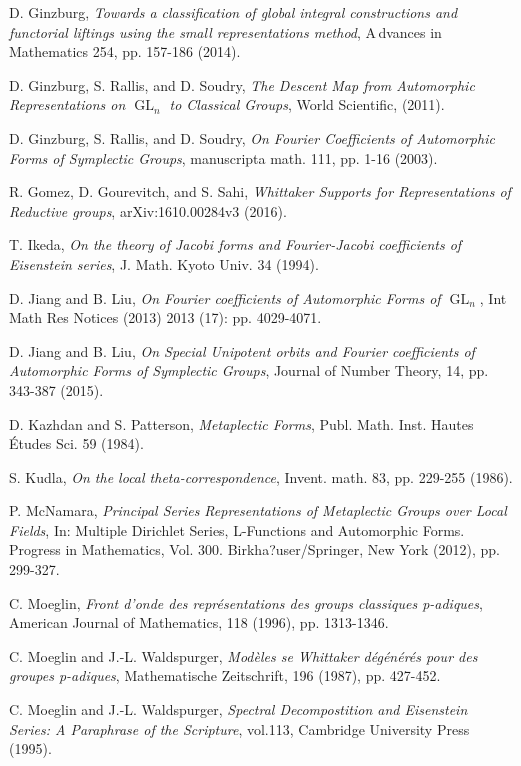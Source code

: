\documentclass[11pt,reqno]{amsart}
\theoremstyle{definition}
\theoremstyle{remark}
\theoremstyle{definition}
\begin{document}
\begin{thebibliography}{99}
D. Ginzburg, \emph{Towards a classification of global integral constructions and functorial liftings using the small representations method}, A\,dvances in Mathematics  254, pp. 157-186 (2014).

 D. Ginzburg, S. Rallis, and D. Soudry, \emph{The Descent Map from Automorphic Representations on $\operatorname{GL}_n$ to Classical Groups}, World Scientific, (2011).

 D. Ginzburg, S. Rallis, and D. Soudry, \emph{On Fourier Coefficients of Automorphic Forms of Symplectic Groups}, manuscripta math. 111, pp. 1-16 (2003).

 R. Gomez, D. Gourevitch, and S. Sahi, \emph{Whittaker Supports for Representations of Reductive groups},  arXiv:1610.00284v3 (2016).

 T. Ikeda, \emph{On the theory of Jacobi forms and Fourier-Jacobi coefficients of Eisenstein series}, J. Math. Kyoto Univ. 34 (1994).

 D. Jiang and B. Liu, \emph{On Fourier coefficients of Automorphic Forms of $\operatorname{GL}_n$}, Int Math Res Notices (2013) 2013 (17): pp. 4029-4071.

 D. Jiang and B. Liu, \emph{On Special Unipotent orbits and Fourier coefficients of Automorphic Forms of Symplectic Groups}, Journal of Number Theory,  14, pp. 343-387 (2015).

 D. Kazhdan and S. Patterson, \emph{Metaplectic Forms}, Publ. Math. Inst. Hautes \'{E}tudes Sci. 59 (1984).

 S. Kudla, \emph{On the local theta-correspondence}, Invent. math. 83, pp. 229-255 (1986).

 P. McNamara, \emph{Principal Series Representations of Metaplectic Groups over Local Fields}, In: Multiple Dirichlet Series, L-Functions and Automorphic Forms. Progress in Mathematics, Vol. 300. Birkha?user/Springer, New York (2012), pp. 299-327.

 C. Moeglin, \emph{Front d'onde des repr\'{e}sentations des groups classiques p-adiques}, American Journal of Mathematics, 118 (1996), pp. 1313-1346.

 C. Moeglin and J.-L. Waldspurger, \emph{Mod\`{e}les se Whittaker d\'{e}g\'{e}n\'{e}r\'{e}s pour des groupes p-adiques}, Mathematische Zeitschrift, 196 (1987), pp. 427-452.

 C. Moeglin and J.-L. Waldspurger, \emph{Spectral Decompostition and Eisenstein Series: A Paraphrase of the Scripture}, vol.113, Cambridge University Press (1995).


\end{thebibliography}
\end{document}
